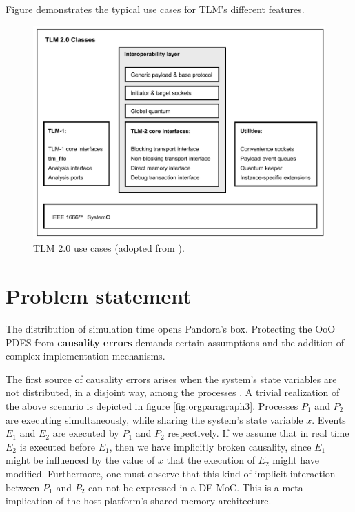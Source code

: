 \documentclass[12pt,twoside]{article}
\begin{document}
Figure demonstrates the typical use cases for TLM's different features.
\begin{figure}[htb]
\centering
\includegraphics[width=.9\linewidth]{Figures/tlm_use_cases.png}
\caption{\label{fig:orgparagraph2}
TLM 2.0 use cases (adopted from \cite{OpenSystemCInitiative2009}).}
\end{figure}




\section{Problem statement}
\label{sec:orgheadline9}
The distribution of simulation time opens Pandora's box. 
Protecting the OoO PDES from \textbf{causality errors} demands certain assumptions and the addition of complex implementation mechanisms.

The first source of causality errors arises when the system's state variables are not distributed, in a disjoint way, among the processes \cite{Fujimoto1990}.
A trivial realization of the above scenario is depicted in figure \ref{fig:orgparagraph3}. Processes \(P_1\) and \(P_2\) are executing simultaneously, while sharing the system's state variable \(x\).
Events \(E_1\) and \(E_2\) are executed by \(P_1\) and \(P_2\) respectively. If we assume that in real time \(E_2\) is executed before \(E_1\), then we have implicitly broken causality, since \(E_1\) might be influenced
by the value of \(x\) that the execution of \(E_2\) might have modified. Furthermore, one must observe that this kind of implicit interaction between \(P_1\) and \(P_2\) can not be expressed in a DE MoC. 
This is a meta-implication of the host platform's shared memory architecture.
\end{document}
